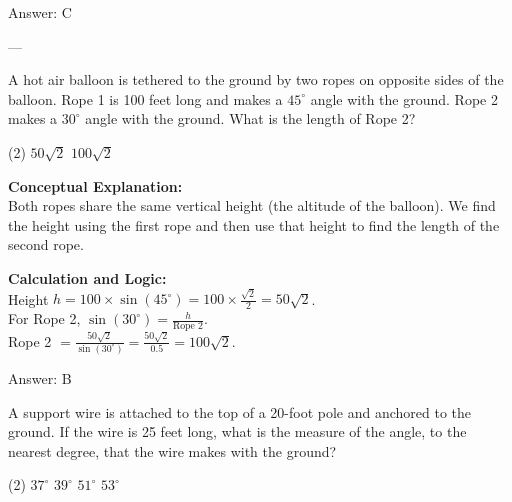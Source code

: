 \documentclass[11pt,paper=a4,answers]{exam}
\begin{document}
\begin{questions}
\begin{solution}
\vspace{15pt}
Answer: \colorbox{yellow!100}{C}
\end{solution}

% 

---

\question
A hot air balloon is tethered to the ground by two ropes on opposite sides of the balloon. Rope 1 is 100 feet long and makes a $45^\circ$ angle with the ground. Rope 2 makes a $30^\circ$ angle with the ground. What is the length of Rope 2?
\begin{tasks}(2)
    \task $50\sqrt{2}$
    \task $100\sqrt{2}$
\end{tasks}

\begin{solution}
\textbf{Conceptual Explanation:} \\
Both ropes share the same vertical height (the altitude of the balloon). We find the height using the first rope and then use that height to find the length of the second rope.

\vspace{10pt}
\textbf{Calculation and Logic:} \\
Height $h = 100 \times \sin(45^\circ) = 100 \times \frac{\sqrt{2}}{2} = 50\sqrt{2}$. \\
For Rope 2, $\sin(30^\circ) = \frac{h}{\text{Rope 2}}$. \\
Rope 2 $= \frac{50\sqrt{2}}{\sin(30^\circ)} = \frac{50\sqrt{2}}{0.5} = 100\sqrt{2}$.

\vspace{15pt}
Answer: \colorbox{yellow!100}{B}
\end{solution}


\question
A support wire is attached to the top of a 20-foot pole and anchored to the ground. If the wire is 25 feet long, what is the measure of the angle, to the nearest degree, that the wire makes with the ground?
\begin{center}
\end{center}
\begin{tasks}(2)
    \task $37^\circ$
    \task $39^\circ$
    \task $51^\circ$
    \task $53^\circ$
\end{tasks}


\end{questions}
\end{document}
